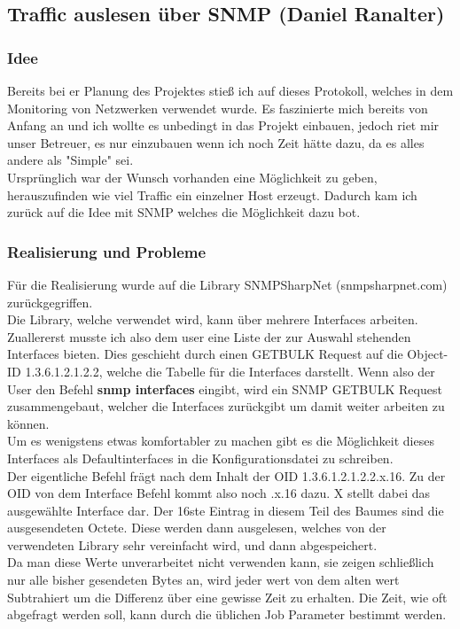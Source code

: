 \documentclass[12pt,a4paper]{report}
\begin{document}
\begin{onehalfspace}
\newpage
{}%

\subsection{Traffic auslesen über SNMP (Daniel Ranalter)}
\subsubsection{Idee}
Bereits bei er Planung des Projektes stieß ich auf dieses Protokoll, welches in dem Monitoring von Netzwerken verwendet wurde. Es faszinierte mich bereits von Anfang an und ich wollte es unbedingt in das Projekt einbauen, jedoch riet mir unser Betreuer, es nur einzubauen wenn ich noch Zeit hätte dazu, da es alles andere als "Simple" sei.\\
Ursprünglich war der Wunsch vorhanden eine Möglichkeit zu geben, herauszufinden wie viel Traffic ein einzelner Host erzeugt. Dadurch kam ich zurück auf die Idee mit SNMP welches die Möglichkeit dazu bot.\\

\subsubsection{Realisierung und Probleme}
Für die Realisierung wurde auf die Library SNMPSharpNet (snmpsharpnet.com) zurückgegriffen.\\

Die Library, welche verwendet wird, kann über mehrere Interfaces arbeiten. Zuallererst musste ich also dem user eine Liste der zur Auswahl stehenden Interfaces bieten. Dies geschieht durch einen GETBULK Request auf die Object-ID 1.3.6.1.2.1.2.2, welche die Tabelle für die Interfaces darstellt. Wenn also der User den Befehl \textbf{snmp interfaces} eingibt, wird ein SNMP GETBULK Request zusammengebaut, welcher die Interfaces zurückgibt um damit weiter arbeiten zu können.\\
Um es wenigstens etwas komfortabler zu machen gibt es die Möglichkeit dieses Interfaces als Defaultinterfaces in die Konfigurationsdatei zu schreiben.\\

Der eigentliche Befehl frägt nach dem Inhalt der OID 1.3.6.1.2.1.2.2.x.16. Zu der OID von dem Interface Befehl kommt also noch .x.16 dazu. X stellt dabei das ausgewählte Interface dar. Der 16ste Eintrag in diesem Teil des Baumes sind die ausgesendeten Octete. Diese werden dann ausgelesen, welches von der verwendeten Library sehr vereinfacht wird, und dann abgespeichert.\\
Da man diese Werte unverarbeitet nicht verwenden kann, sie zeigen schließlich nur alle bisher gesendeten Bytes an, wird jeder wert von dem alten wert Subtrahiert um die Differenz über eine gewisse Zeit zu erhalten. Die Zeit, wie oft abgefragt werden soll, kann durch die üblichen Job Parameter bestimmt werden.\\


\end{onehalfspace}
\end{document}
